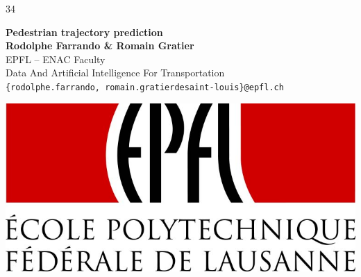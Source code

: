 \documentclass[a0,portrait]{a0poster}
\begin{document}
 \fontsize{32} {34}
 \selectfont


\begin{minipage}[b]{0.75\linewidth}
\veryHuge \color{NavyBlue} \textbf{Pedestrian trajectory prediction} \color{Black}\\ %
\huge \textbf{Rodolphe Farrando \& Romain Gratier}\\[0.5cm] %
\huge EPFL -- ENAC Faculty\\[0.4cm] %
\LARGE Data And Artificial Intelligence For Transportation\\[0.4cm]
\Large \texttt{\{rodolphe.farrando, romain.gratierdesaint-louis\}@epfl.ch}\\
\end{minipage}
%
\begin{minipage}[b]{0.25\linewidth}
\includegraphics[width=20cm]{./figure/epfl_logo.jpg}\\
\end{minipage}


\end{document}
